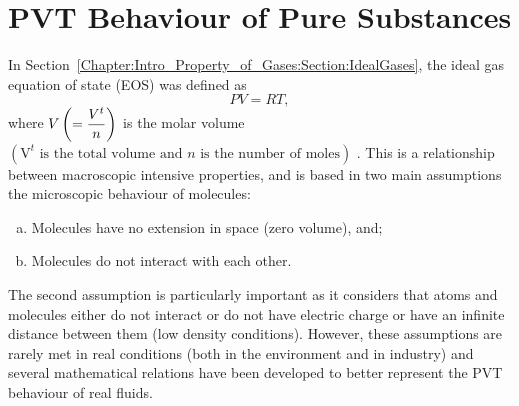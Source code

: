 \section{PVT Behaviour of Pure Substances}\label{Chapter:VolumetricPropertiesPureSubstances:Section:PVTBehaviour}
In Section~\ref{Chapter:Intro_Property_of_Gases:Section:IdealGases}, the ideal gas equation of state (EOS) was defined as 
     \begin{displaymath}
        PV = RT,
     \end{displaymath}
     where $V\left(=\displaystyle\frac{V^{t}}{n}\right)$ is the molar volume $\left(\text{V}^{t}\text{ is the total volume and } n \text{ is the number of moles}\right)$ . This is a relationship between macroscopic intensive properties, and is based in two main assumptions \wrt the microscopic behaviour of molecules:
     \begin{enumerate}[(a)]
        \item Molecules have no extension in space (\ie zero volume), and;
        \item Molecules do not interact with each other.
     \end{enumerate}
     The second assumption is particularly important as it considers that atoms and molecules either do not interact or do not have electric charge or have an infinite distance between them (\ie low density conditions). However, these assumptions are rarely met in real conditions (both in the environment and in industry) and several mathematical relations have been developed to better represent the PVT behaviour of real fluids.

